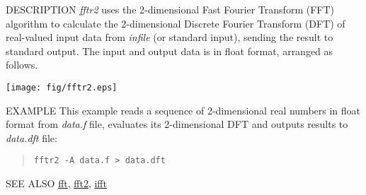 \begin{synopsis}
\item[fftr2] [ --l $L$ ] [ --m $M_1 \; M_2$ ] [ --t ] [ --c ] [ --q ] 
	     [ --\{ A $|$ R $|$ I $|$ P \} ] [ {\em infile} ] 
\end{synopsis}

\begin{qsection}{DESCRIPTION}
{\em fftr2} uses the 2-dimensional Fast Fourier Transform (FFT) algorithm 
to calculate the 2-dimensional Discrete Fourier Transform (DFT) 
of real-valued input data from {\em infile} (or standard input), 
sending the result to standard output. 
The input and output data is in float format, arranged as follows.
\begin{center}
 \leavevmode
 \texttt{[image: fig/fftr2.eps]}
\end{center}
\end{qsection}

\begin{options}
\end{options}

\begin{qsection}{EXAMPLE}
This example reads a sequence of 2-dimensional real numbers in float format
from {\em data.f} file, evaluates its 2-dimensional DFT and outputs results to {\em
data.dft} file:
\begin{quote}
  \verb!fftr2 -A data.f > data.dft!
\end{quote}
\end{qsection}

\begin{qsection}{SEE ALSO}
\hyperlink{fft}{fft},
\hyperlink{fft2}{fft2},
\hyperlink{ifft}{ifft}
\end{qsection}

